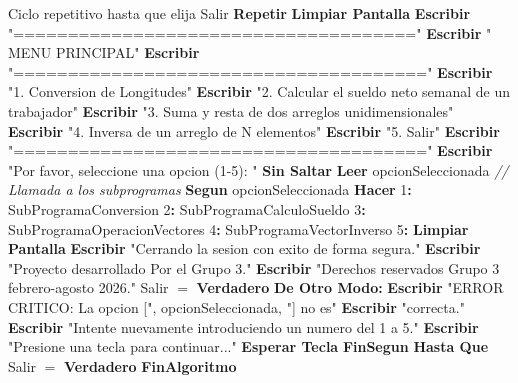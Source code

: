 \documentclass[12pt,a4paper]{article}
\newcommand{\kw}[1]{\textcolor{pseKeyword}{\textbf{#1}}}
\newcommand{\txt}[1]{\textcolor{pseString}{"#1"}}
\newcommand{\num}[1]{\textcolor{pseNumber}{#1}}
\newcommand{\cmt}[1]{\textcolor{pseComment}{\textit{// #1}}}
\newcommand{\opAsig}{\textcolor{pseKeyword}{$=$}}
\newcommand{\opIgual}{\textcolor{pseKeyword}{$=$}}
\newcommand{\Asignacion}[2]{#1\; \opAsig\; #2}
\newcommand{\Escribir}[1]{\kw{Escribir} #1}
\newcommand{\EscribirSS}[1]{\kw{Escribir} #1 \kw{Sin Saltar}}
\newcommand{\Leer}[1]{\kw{Leer} #1}
\newcommand{\Repetir}{\kw{Repetir}}
\newcommand{\HastaQue}[1]{\kw{Hasta Que} #1}
\newcommand{\Segun}[1]{\kw{Segun} #1 \kw{Hacer}}
\newcommand{\FinSegun}{\kw{FinSegun}}
\newcommand{\DeOtroModo}{\kw{De Otro Modo:}}
\newcommand{\I}{\hspace{1.5em}}
\newcommand{\II}{\hspace{3.0em}}
\newcommand{\III}{\hspace{4.5em}}
\newcommand{\IV}{\hspace{5.5em}}
\begin{document}
\begin{algorithmic}[1]
	
	\State \I \kw \cmt{Ciclo repetitivo hasta que elija Salir}
	\State \I \kw \Repetir
	\State \II \kw{Limpiar Pantalla}
	\State \II \Escribir{\txt{=====================================}}
	\State \II \Escribir{\txt{              MENU PRINCIPAL}}
	\State \II \Escribir{\txt{======================================}}
	\State \II \Escribir{\txt{1. Conversion de Longitudes}}
	\State \II \Escribir{\txt{2. Calcular el sueldo neto semanal de un trabajador}}
	\State \II \Escribir{\txt{3. Suma y resta de dos arreglos unidimensionales}}
	\State \II \Escribir{\txt{4. Inversa de un arreglo de N elementos}}
	\State \II \Escribir{\txt{5. Salir}}
	\State \II \Escribir{\txt{======================================}}
	\State \II \EscribirSS{\txt{Por favor, seleccione una opcion (1-5): }}
	\State \II \Leer{opcionSeleccionada}
	\State
	\State \II \cmt{Llamada a los subprogramas}
	\State \II \Segun{opcionSeleccionada}
	\State \III \num{1}\textbf{:}
	\State \IV SubProgramaConversion
	\State \III \num{2}\textbf{:}
	\State \IV SubProgramaCalculoSueldo
	\State \III \num{3}\textbf{:}
	\State \IV SubProgramaOperacionVectores
	\State \III \num{4}\textbf{:}
	\State \IV SubProgramaVectorInverso
	\State \III \num{5}\textbf{:}
	\State \IV \kw{Limpiar Pantalla}
	\State \IV \Escribir{\txt{Cerrando la sesion con exito de forma segura.}}
	\State \IV \Escribir{\txt{Proyecto desarrollado Por el Grupo 3.}}
	\State \IV \Escribir{\txt{Derechos reservados Grupo 3 febrero-agosto 2026.}}
	\State \IV \Asignacion{Salir}{\kw{Verdadero}}
	\State \III \DeOtroModo
	\State \III \Escribir{\txt{ERROR CRITICO: La opcion [}, opcionSeleccionada, \txt{] no es}}
	\State \III \Escribir{\txt{correcta.}}
	\State \IV \Escribir{\txt{Intente nuevamente introduciendo un numero del 1 a 5.}}
	\State \IV \Escribir{\txt{Presione una tecla para continuar...}}
	\State \IV \kw{Esperar Tecla}
	\State \II \FinSegun
	\State \I \HastaQue{Salir \opIgual{} \kw{Verdadero}}
	\State
	\State \kw{FinAlgoritmo}
	

\end{algorithmic}
\end{document}
